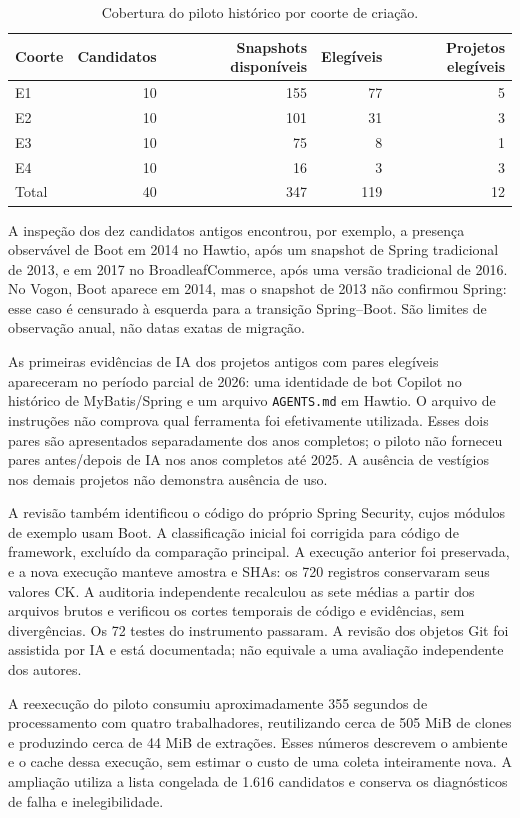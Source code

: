 \begin{table}[htbp]
\centering
\caption{Cobertura do piloto histórico por coorte de criação.}
\label{tab:piloto-historico-cobertura}
\small
\begin{tabular}{lrrrr}
\hline
Coorte & Candidatos & Snapshots disponíveis & Elegíveis & Projetos elegíveis \\
\hline
E1 & 10 & 155 & 77 & 5 \\
E2 & 10 & 101 & 31 & 3 \\
E3 & 10 & 75 & 8 & 1 \\
E4 & 10 & 16 & 3 & 3 \\
\hline
Total & 40 & 347 & 119 & 12 \\
\hline
\end{tabular}
\end{table}

A inspeção dos dez candidatos antigos encontrou, por exemplo, a presença observável de Boot em 2014 no Hawtio, após um snapshot de Spring tradicional de 2013, e em 2017 no BroadleafCommerce, após uma versão tradicional de 2016. No Vogon, Boot aparece em 2014, mas o snapshot de 2013 não confirmou Spring: esse caso é censurado à esquerda para a transição Spring--Boot. São limites de observação anual, não datas exatas de migração.

As primeiras evidências de IA dos projetos antigos com pares elegíveis apareceram no período parcial de 2026: uma identidade de bot Copilot no histórico de MyBatis/Spring e um arquivo \texttt{AGENTS.md} em Hawtio. O arquivo de instruções não comprova qual ferramenta foi efetivamente utilizada. Esses dois pares são apresentados separadamente dos anos completos; o piloto não forneceu pares antes/depois de IA nos anos completos até 2025. A ausência de vestígios nos demais projetos não demonstra ausência de uso.

A revisão também identificou o código do próprio Spring Security, cujos módulos de exemplo usam Boot. A classificação inicial foi corrigida para código de framework, excluído da comparação principal. A execução anterior foi preservada, e a nova execução manteve amostra e SHAs: os 720 registros conservaram seus valores CK. A auditoria independente recalculou as sete médias a partir dos arquivos brutos e verificou os cortes temporais de código e evidências, sem divergências. Os 72 testes do instrumento passaram. A revisão dos objetos Git foi assistida por IA e está documentada; não equivale a uma avaliação independente dos autores.

A reexecução do piloto consumiu aproximadamente 355 segundos de processamento com quatro trabalhadores, reutilizando cerca de 505 MiB de clones e produzindo cerca de 44 MiB de extrações. Esses números descrevem o ambiente e o cache dessa execução, sem estimar o custo de uma coleta inteiramente nova. A ampliação utiliza a lista congelada de 1.616 candidatos e conserva os diagnósticos de falha e inelegibilidade.

